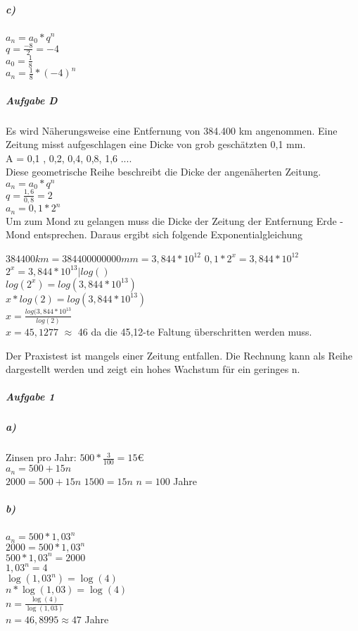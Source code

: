 \documentclass{article}
\begin{document}
	\subparagraph*{c)}
	$a_{n} = a_{0} * q^{n}$ \\
	$q = \frac{-8}{2} = -4$ \\
	$a_{0} = \frac{1}{8}$ \\
	$a_{n} = \frac{1}{8}*(-4)^{n}$
	
	\subparagraph*{Aufgabe D}
	Es wird Näherungsweise eine Entfernung von 384.400 km angenommen. Eine Zeitung misst aufgeschlagen eine Dicke von grob geschätzten 0,1 mm. \\
	
	A = 0,1 , 0,2, 0,4, 0,8, 1,6 .... \\
	Diese geometrische Reihe beschreibt die Dicke der angenäherten Zeitung. \\
	$a_{n} = a_{0}  * q^{n}$ \\
	$q = \frac{1,6}{0,8} = 2$ \\
	$a_{n} = 0,1 * 2^{n}$ \\
	Um zum Mond zu gelangen muss die Dicke der Zeitung der Entfernung Erde - Mond entsprechen. Daraus ergibt sich folgende Exponentialgleichung \linebreak
	
	$384400 km = 384400000000 mm = 3,844 * 10^{12}$
	$0,1 *2^{x} = 3,844 * 10^{12}$ \\
	$2^{x} = 3,844 * 10^{13} |log()$ \\
	$log(2^{x}) = log(3,844 * 10^{13})$ \\
	$x * log(2) = log(3,844 * 10^{13})$ \\
	$x = \frac{log(3,844 * 10^{13}}{  log(2)} $ \\
	$x = 45,1277$ $\approx$ 46 da die 45,12-te Faltung überschritten werden muss. 
	
 Der Praxistest ist mangels einer Zeitung entfallen.
	Die Rechnung kann als Reihe dargestellt werden und zeigt ein hohes Wachstum für ein geringes n.

	\subparagraph*{Aufgabe 1}
	
	\subparagraph*{a)}
	
	Zinsen pro Jahr: $500 * \frac{3}{100} = 15 €$ \\
	$a_{n} = 500 + 15n$ \\
	$2000 = 500 + 15n$
	$1500 = 15n$
	$n = 100$ Jahre
	
	
	\subparagraph*{b)}
	$a_{n} = 500 * 1,03^{n}$ \\
	$2000 = 500 * 1,03^{n}$ \\
	$500 * 1,03^{n} = 2000$ \\
	$1,03^{n} = 4$ \\
	$\log(1,03^{n}) = \log(4)$ \\
	$n * \log(1,03) = \log(4)$ \\
	$n   = \frac{\log(4)}{\log(1,03)} $ \\
	$n = 46,8995 \approx 47$ Jahre
		
\end{document}
